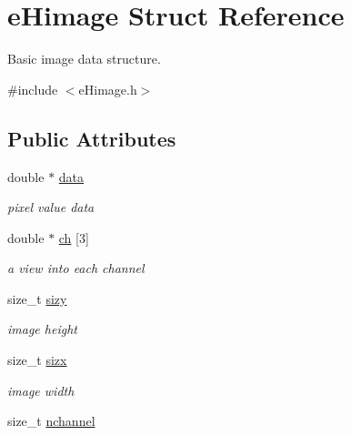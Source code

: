 \hypertarget{structeHimage}{\section{e\-Himage Struct Reference}
\label{structeHimage}
}


Basic image data structure.  




{\ttfamily \#include $<$e\-Himage.\-h$>$}

\subsection*{Public Attributes}
\begin{DoxyCompactItemize}
\item 
\hypertarget{structeHimage_af3cd8581b5bbff79b7344bfe4fac6c5a}{double $\ast$ \hyperlink{structeHimage_af3cd8581b5bbff79b7344bfe4fac6c5a}{data}}\label{structeHimage_af3cd8581b5bbff79b7344bfe4fac6c5a}

\begin{DoxyCompactList}\small\item\em pixel value data \end{DoxyCompactList}\item 
\hypertarget{structeHimage_a9483a5238c06a352128db41c7a4038b7}{double $\ast$ \hyperlink{structeHimage_a9483a5238c06a352128db41c7a4038b7}{ch} \mbox{[}3\mbox{]}}\label{structeHimage_a9483a5238c06a352128db41c7a4038b7}

\begin{DoxyCompactList}\small\item\em a view into each channel \end{DoxyCompactList}\item 
\hypertarget{structeHimage_a0a2c38985ae94bedd3252e225f423abd}{size\-\_\-t \hyperlink{structeHimage_a0a2c38985ae94bedd3252e225f423abd}{sizy}}\label{structeHimage_a0a2c38985ae94bedd3252e225f423abd}

\begin{DoxyCompactList}\small\item\em image height \end{DoxyCompactList}\item 
\hypertarget{structeHimage_a32762d41a4a29f7f4ec2deeaf89581b7}{size\-\_\-t \hyperlink{structeHimage_a32762d41a4a29f7f4ec2deeaf89581b7}{sizx}}\label{structeHimage_a32762d41a4a29f7f4ec2deeaf89581b7}

\begin{DoxyCompactList}\small\item\em image width \end{DoxyCompactList}\item 
\hypertarget{structeHimage_a78c894ca2a89fca4e1b927e5ecfa27a4}{size\-\_\-t \hyperlink{structeHimage_a78c894ca2a89fca4e1b927e5ecfa27a4}{nchannel}}\label{structeHimage_a78c894ca2a89fca4e1b927e5ecfa27a4}


\end{DoxyCompactItemize}
